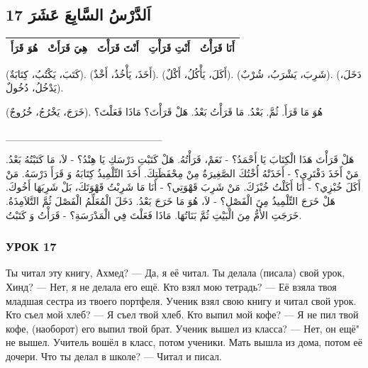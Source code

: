 \documentclass[a5paper]{article}
\begin{document}
\subsection{17 اَلدَّرْسُ السَّابِعَ عَشَرَ}

\bigskip

\begin{center}
\tablefirsthead{}
\tablehead{}
\tabletail{}
\tablelasttail{}
\begin{supertabular}{|m{0.9212598in}|m{1.1712599in}|m{1.2962599in}|m{1.2962599in}|m{1.0670599in}|}
\hline
هُوَ قَرَأَ &
هِيَ قَرَأَتْ &
أَنْتَ قَرَأْتَ &
أَنْتِ قَرَأْتِ &
أَنَا قَرَأْتُ\\\hline
\end{supertabular}
\end{center}
(كَتَبَ، يَكْتُبُ، كِتَابَةٌ). (أَخَذَ، يَأْخُذُ، أَخْذٌ). (أَكَلَ، يَأْكُلُ، أَكْلٌ). (شَرِبَ، يَشْرَبُ، شُرْبٌ). (دَخَلَ، يَدْخُلُ، دُخُولٌ).

(خَرَجَ، يَخْرُجُ، خُرُوجٌ). هُوَ مَا قَرَأَ. ثُمَّ. بَعْدُ. مَا قَرَأْتُ بَعْدُ. هَلْ قَرَأْتَ؟ مَاذَا فَعَلْتَ؟

\_\_\_\_\_\_\_\_\_\_\_\_\_\_\_\_\_\_\_\_\_

هَلْ قَرَأْتَ هَذَا الْكِتَابَ يَا أَحْمَدُ؟ - نَعَمْ، قَرَأْتُهُ. هَلْ كَتَبْتِ دَرْسَكِ يَا هِنْدُ؟ - لاَ، مَا كَتَبْتُهُ بَعْدُ. مَنْ أَخَذَ دَفْتَرِي؟ - أَخَذَتْهُ أُخْتُكَ الصَّغِيرَةُ مِنْ مِحْفَظَتِكَ. أَخَذَ التِّلْمِيذُ كِتَابَهُ وَ قَرَأَ دَرْسَهُ. مَنْ أَكَلَ خُبْزِي؟ - أَنَا أَكَلْتُ خُبْزَكَ. مَنْ شَرِبَ قَهْوَتِي؟ - أَنَا مَا شَرِبْتُ قَهْوَتَكَ، بَلْ شَرِبَهَا أَخُوكَ. هَلْ خَرَجَ التِّلْمِيذُ مِنَ الْفَصْلِ؟ - لاَ، هُوَ مَا خَرَجَ بَعْدُ. دَخَلَ الْمُعَلِّمُ الْفَصْلَ ثُمَّ التَّلاَمِذَةُ. خَرَجَتِ الأُمُّ مِنَ الْبَيْتِ ثُمَّ بَنَاتُهَا. مَاذَا فَعَلْتَ فِي الْمَدْرَسَةِ؟ - قَرَأْتُ وَ كَتَبْتُ.

\subsubsection{УРОК 17}
Ты читал эту книгу, Ахмед? — Да, я её читал. Ты делала (писала) свой урок, Хинд? — Нет, я не делала его ещё. Кто взял мою те­традь? — Её взяла твоя младшая сестра из твоего портфеля. Ученик взял свою книгу и читал свой урок. Кто съел мой хлеб? — Я съел твой хлеб. Кто выпил мой кофе? — Я не пил твой кофе, (наоборот) его выпил твой брат. Ученик вышел из класса? — Нет, он ещё" не вышел. Учитель вошёл в класс, потом ученики. Мать вышла из дома, потом её дочери. Что ты делал в школе? — Читал и писал.
\end{document}
